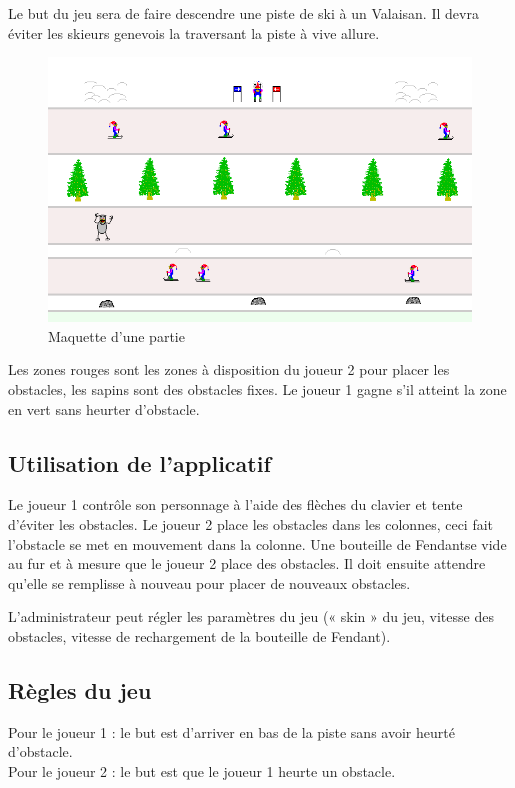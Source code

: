 \documentclass[a4paper,11pt]{article}
\begin{document}
	Le but du jeu sera de faire descendre une piste de ski à un Valaisan. Il devra éviter les skieurs genevois la traversant la piste à vive allure.

	\begin{figure}[h!]
		\centering
		\includegraphics[scale=0.7]{../Screenshots/demo.png}		\caption{Maquette d'une partie}
		\label{fig:maquette}
	\end{figure}

	Les zones rouges sont les zones à disposition du joueur 2 pour placer les obstacles, les sapins sont des obstacles fixes. Le joueur 1 gagne s'il atteint la zone en vert sans heurter d'obstacle.

	\subsection{Utilisation de l'applicatif}
	Le joueur 1 contrôle son personnage à l'aide des flèches du clavier et tente d'éviter les obstacles. Le joueur 2 place les obstacles dans les colonnes, ceci fait l'obstacle se met en mouvement dans la colonne. Une bouteille de Fendant\texttrademark se vide au fur et à mesure que le joueur 2 place des obstacles. Il doit ensuite attendre qu'elle se remplisse à nouveau pour placer de nouveaux obstacles.\par

	L'administrateur peut régler les paramètres du jeu (« skin » du jeu, vitesse des obstacles, vitesse de rechargement de la bouteille de Fendant\texttrademark).

	\subsection{Règles du jeu}
	Pour le joueur 1 : le but est d'arriver en bas de la piste sans avoir heurté d'obstacle. \\
	Pour le joueur 2 : le but est que le joueur 1 heurte un obstacle.
\end{document}

